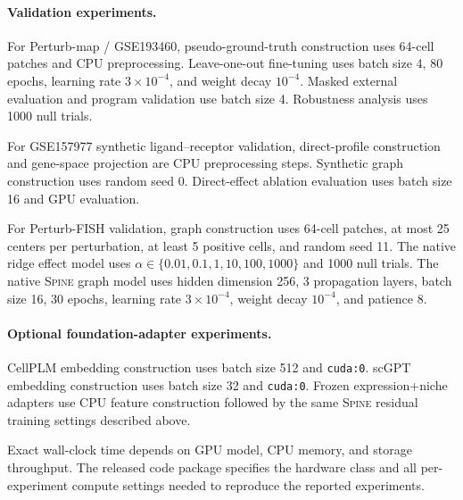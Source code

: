 \documentclass[sigconf,review,balance=false]{acmart}
\newcommand{\methodname}{\textsc{Spine}\xspace}
\begin{document}
\paragraph{Validation experiments.}
For Perturb-map / GSE193460, pseudo-ground-truth construction uses 64-cell patches and CPU preprocessing. Leave-one-out fine-tuning uses batch size 4, 80 epochs, learning rate $3\times10^{-4}$, and weight decay $10^{-4}$. Masked external evaluation and program validation use batch size 4. Robustness analysis uses 1000 null trials.

For GSE157977 synthetic ligand--receptor validation, direct-profile construction and gene-space projection are CPU preprocessing steps. Synthetic graph construction uses random seed 0. Direct-effect ablation evaluation uses batch size 16 and GPU evaluation.

For Perturb-FISH validation, graph construction uses 64-cell patches, at most 25 centers per perturbation, at least 5 positive cells, and random seed 11. The native ridge effect model uses $\alpha\in\{0.01,0.1,1,10,100,1000\}$ and 1000 null trials. The native \methodname{} graph model uses hidden dimension 256, 3 propagation layers, batch size 16, 30 epochs, learning rate $3\times10^{-4}$, weight decay $10^{-4}$, and patience 8.

\paragraph{Optional foundation-adapter experiments.}
CellPLM embedding construction uses batch size 512 and \texttt{cuda:0}. scGPT embedding construction uses batch size 32 and \texttt{cuda:0}. Frozen expression+niche adapters use CPU feature construction followed by the same \methodname{} residual training settings described above.

Exact wall-clock time depends on GPU model, CPU memory, and storage throughput. The released code package specifies the hardware class and all per-experiment compute settings needed to reproduce the reported experiments.
\end{document}
